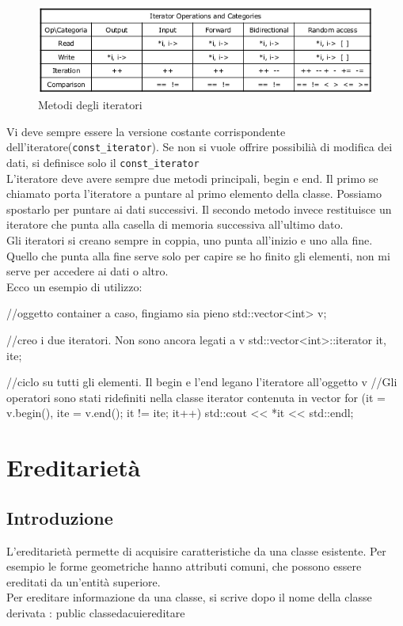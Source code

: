 \begin{figure}[H]
\centering
\includegraphics[scale=0.7]{Tab_iteratori}
\caption{Metodi degli iteratori}
\end{figure}

Vi deve sempre essere la versione costante corrispondente dell'iteratore(\verb|const_iterator|). Se non si vuole offrire possibilià di modifica dei dati, si definisce solo il \verb|const_iterator|\\
L'iteratore deve avere sempre due metodi principali, begin e end. Il primo se chiamato porta l'iteratore a puntare al primo elemento della classe. Possiamo spostarlo per puntare ai dati successivi. Il secondo metodo invece restituisce un iteratore che punta alla casella di memoria successiva all'ultimo dato.\\
Gli iteratori si creano sempre in coppia, uno punta all'inizio e uno alla fine. Quello che punta alla fine serve solo per capire se ho finito gli elementi, non mi serve per accedere ai dati o altro.\\
Ecco un esempio di utilizzo:

\begin{cpp}
//oggetto container a caso, fingiamo sia pieno
std::vector<int> v;

//creo i due iteratori. Non sono ancora legati a v
std::vector<int>::iterator it, ite;

//ciclo su tutti gli elementi. Il begin e l'end legano l'iteratore all'oggetto v
//Gli operatori sono stati ridefiniti nella classe iterator contenuta in vector
for (it = v.begin(), ite = v.end(); it != ite; it++){
	std::cout << *it << std::endl;
}
\end{cpp}

\chapter{Ereditarietà}
\section{Introduzione}
L'ereditarietà permette di acquisire caratteristiche da una classe esistente. Per esempio le forme geometriche hanno attributi comuni, che possono essere ereditati da un'entità superiore.\\
Per ereditare informazione da una classe, si scrive dopo il nome della classe derivata : public classedacuiereditare\\

